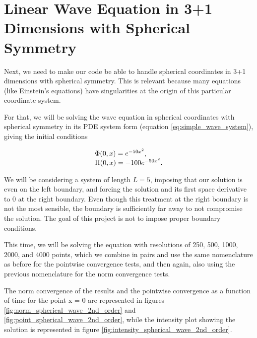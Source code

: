 \section{Linear Wave Equation in 3+1 Dimensions with Spherical Symmetry}
\label{sec:spherical_wave}

Next, we need to make our code be able to handle spherical coordinates in 3+1 dimensions with spherical symmetry. This is relevant because many equations (like Einstein's equations) have singularities at the origin of this particular coordinate system.

For that, we will be solving the wave equation in spherical coordinates with spherical symmetry in its PDE system form (equation \eqref{eq:simple_wave_system}), giving the initial conditions

\begin{align}
    \begin{array}{@{}l@{}}
        \Phi(0,x) = e^{-50x^2},
        \\
        \Pi(0,x) = -100e^{-50x^2}.
    \end{array}
    \label{eq:exp_IC}
\end{align}

We will be considering a system of length $L = 5$, imposing that our solution is even on the left boundary, and forcing the solution and its first space derivative to 0 at the right boundary. Even though this treatment at the right boundary is not the most sensible, the boundary is sufficiently far away to not compromise the solution. The goal of this project is not to impose proper boundary conditions.

This time, we will be solving the equation with resolutions of 250, 500, 1000, 2000, and 4000 points, which we combine in pairs and use the same nomenclature as before for the pointwise convergence tests, and then again, also using the previous nomenclature for the norm convergence tests.

The norm convergence of the results and the pointwise convergence as a function of time for the point x = 0 are represented in figures \ref{fig:norm_spherical_wave_2nd_order} and \ref{fig:point_spherical_wave_2nd_order}, while the intensity plot showing the solution is represented in figure \ref{fig:intensity_spherical_wave_2nd_order}.

